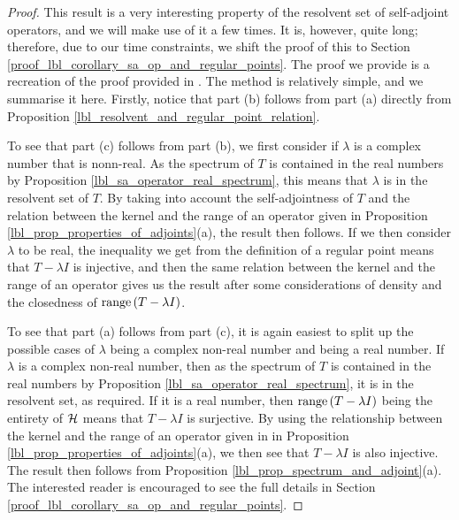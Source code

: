 \begin{proof}
  This result is a very interesting property of the resolvent set of self-adjoint operators, and we will make use of it a few times. It is, however, quite long; therefore, due to our time constraints, we shift the proof of this to Section \eqref{proof_lbl_corollary_sa_op_and_regular_points}. The proof we provide is a recreation of the proof provided in {\cite[Proposition 3.10]{konrad}}. The method is relatively simple, and we summarise it here. Firstly, notice that part (b) follows from part (a) directly from Proposition \eqref{lbl_resolvent_and_regular_point_relation}.

  \medskip

  To see that part (c) follows from part (b), we first consider if $\lambda$ is a complex number that is nonn-real. As the spectrum of $T$ is contained in the real numbers by Proposition \eqref{lbl_sa_operator_real_spectrum}, this means that $\lambda$ is in the resolvent set of $T$. By taking into account the self-adjointness of $T$ and the relation between the kernel and the range of an operator given in Proposition \eqref{lbl_prop_properties_of_adjoints}(a), the result then follows. If we then consider $\lambda$ to be real, the inequality we get from the definition of a regular point means that $T - \lambda I$ is injective, and then the same relation between the kernel and the range of an operator gives us the result after some considerations of density and the closedness of $\operatorname{range}\left(T - \lambda I\right)$.

  \medskip

  To see that part (a) follows from part (c), it is again easiest to split up the possible cases of $\lambda$ being a complex non-real number and being a real number. If $\lambda$ is a complex non-real number, then as the spectrum of $T$ is contained in the real numbers by Proposition \eqref{lbl_sa_operator_real_spectrum}, it is in the resolvent set, as required. If it is a real number, then $\operatorname{range}\left(T - \lambda I\right)$ being the entirety of $\mathcal{H}$ means that $T - \lambda I$ is surjective. By using the relationship between the kernel and the range of an operator given in in Proposition \eqref{lbl_prop_properties_of_adjoints}(a), we then see that $T - \lambda I$ is also injective. The result then follows from  Proposition \eqref{lbl_prop_spectrum_and_adjoint}(a). The interested reader is encouraged to see the full details in Section \eqref{proof_lbl_corollary_sa_op_and_regular_points}.
\end{proof}

